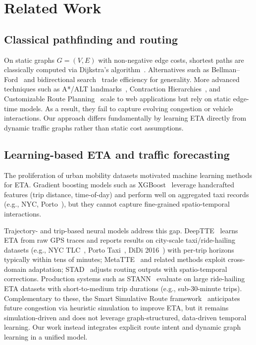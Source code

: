 \section{Related Work}

\subsection{Classical pathfinding and routing}
On static graphs $G=(V,E)$ with non-negative edge costs, shortest paths are classically computed via Dijkstra’s algorithm~\cite{dijkstra1959}. Alternatives such as Bellman–Ford~\cite{bellman1958routing} and bidirectional search~\cite{pohl1971bi} trade efficiency for generality. More advanced techniques such as A*/ALT landmarks~\cite{goldberg2005}, Contraction Hierarchies~\cite{geisberger2008}, and Customizable Route Planning~\cite{delling2011} scale to web applications but rely on static edge-time models. As a result, they fail to capture evolving congestion or vehicle interactions. Our approach differs fundamentally by learning ETA directly from dynamic traffic graphs rather than static cost assumptions.

\subsection{Learning-based ETA and traffic forecasting}
The proliferation of urban mobility datasets motivated machine learning methods for ETA. Gradient boosting models such as XGBoost~\cite{chen2016xgboost} leverage handcrafted features (trip distance, time-of-day) and perform well on aggregated taxi records (e.g., NYC, Porto~\cite{nyc_tlc,moreira2013porto}), but they cannot capture fine-grained spatio-temporal interactions.

Trajectory- and trip-based neural models address this gap. DeepTTE~\cite{deepTTE2018} learns ETA from raw GPS traces and reports results on city-scale taxi/ride-hailing datasets (e.g., NYC TLC~\cite{nyc_tlc}, Porto Taxi~\cite{moreira2013porto}, DiDi 2016~\cite{didi2016}) with per-trip horizons typically within tens of minutes; MetaTTE~\cite{wang2022metatte} and related methods exploit cross-domain adaptation; STAD~\cite{abbar2020stad} adjusts routing outputs with spatio-temporal corrections. Production systems such as STANN~\cite{stann2021} evaluate on large ride-hailing ETA datasets with short-to-medium trip durations (e.g., sub-30-minute trips). Complementary to these, the Smart Simulative Route framework~\cite{SmartSimulativeRoute2025} anticipates future congestion via heuristic simulation to improve ETA, but it remains simulation-driven and does not leverage graph-structured, data-driven temporal learning. Our work instead integrates explicit route intent and dynamic graph learning in a unified model.

